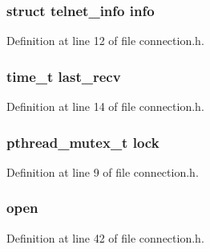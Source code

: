 \subsubsection[{\texorpdfstring{info}{info}}]{\setlength{\rightskip}{0pt plus 5cm}struct {\bf telnet\+\_\+info} info}\hypertarget{structconnection_ae0e5788a0922fcf7ea0e1f73b5fcbea7}{}\label{structconnection_ae0e5788a0922fcf7ea0e1f73b5fcbea7}


Definition at line 12 of file connection.\+h.

\subsubsection[{\texorpdfstring{last\+\_\+recv}{last_recv}}]{\setlength{\rightskip}{0pt plus 5cm}time\+\_\+t last\+\_\+recv}\hypertarget{structconnection_a2d8aa7cb65467972a3e2979501154f95}{}\label{structconnection_a2d8aa7cb65467972a3e2979501154f95}


Definition at line 14 of file connection.\+h.

\subsubsection[{\texorpdfstring{lock}{lock}}]{\setlength{\rightskip}{0pt plus 5cm}pthread\+\_\+mutex\+\_\+t lock}\hypertarget{structconnection_a0abaf4b5d42c4e5d19190035fade3599}{}\label{structconnection_a0abaf4b5d42c4e5d19190035fade3599}


Definition at line 9 of file connection.\+h.

\subsubsection[{\texorpdfstring{open}{open}}]{ open}\hypertarget{structconnection_a052959388a3bbdb746f83ecd99c2faf7}{}\label{structconnection_a052959388a3bbdb746f83ecd99c2faf7}


Definition at line 42 of file connection.\+h.

